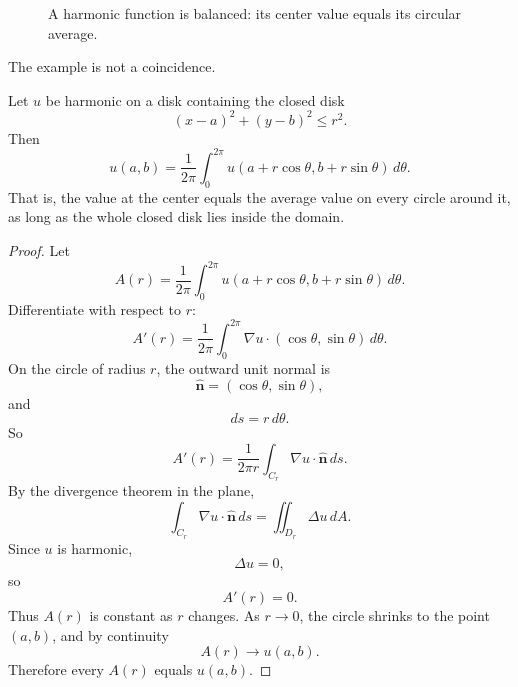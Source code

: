 \begin{figure}[h]
\centering
{}
\caption{A harmonic function is balanced: its center value equals its circular average.}
\end{figure}

The example is not a coincidence.

\begin{theorem}
Let \(u\) be harmonic on a disk containing the closed disk
\[
    (x-a)^2+(y-b)^2\le r^2.
\]
Then
\[
\boxed{
    u(a,b)
    =
    \frac1{2\pi}\int_0^{2\pi}
    u(a+r\cos\theta,b+r\sin\theta)\,d\theta.
}
\]
That is, the value at the center equals the average value on every circle around it,
as long as the whole closed disk lies inside the domain.
\end{theorem}

\begin{proof}
Let
\[
    A(r)=\frac1{2\pi}\int_0^{2\pi}
    u(a+r\cos\theta,b+r\sin\theta)\,d\theta.
\]
Differentiate with respect to \(r\):
\[
    A'(r)
    =
    \frac1{2\pi}\int_0^{2\pi}
    \nabla u\cdot(\cos\theta,\sin\theta)\,d\theta.
\]
On the circle of radius \(r\), the outward unit normal is
\[
    \widehat{\mathbf n}=(\cos\theta,\sin\theta),
\]
and
\[
    ds=r\,d\theta.
\]
So
\[
    A'(r)
    =
    \frac1{2\pi r}
    \int_{C_r}\nabla u\cdot\widehat{\mathbf n}\,ds.
\]
By the divergence theorem in the plane,
\[
    \int_{C_r}\nabla u\cdot\widehat{\mathbf n}\,ds
    =
    \iint_{D_r}\Delta u\,dA.
\]
Since \(u\) is harmonic,
\[
    \Delta u=0,
\]
so
\[
    A'(r)=0.
\]
Thus \(A(r)\) is constant as \(r\) changes.  As \(r\to0\), the circle shrinks to the
point \((a,b)\), and by continuity
\[
    A(r)\to u(a,b).
\]
Therefore every \(A(r)\) equals \(u(a,b)\).
\end{proof}

